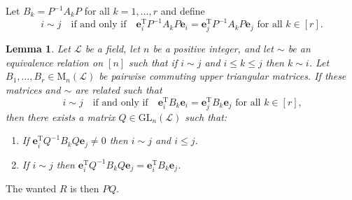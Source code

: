 \documentclass[12pt]{article}
\newtheorem{lemma}[theorem]{Lemma}
\newcommand{\mc}{\mathcal}
\newcommand{\vek}{\mathbf}
\newcommand{\Mat}{\mathrm{M}}
\newcommand{\GL}{\mathrm{GL}}
\newcommand{\Trans}[1]{#1^{\mathrm{T}}\!}
\begin{document}
\noindent
Let \(B_k = P^{-1} A_k P\) for all \(k=1,\dotsc,r\) and define
\begin{equation*}
  i \sim j
  \quad\text{if and only if}\quad
  \Trans{\vek{e}_i} P^{-1} A_k P \vek{e}_i = 
    \Trans{\vek{e}_j} P^{-1} A_k P \vek{e}_j
  \text{ for all }k \in [r]\text{.}
\end{equation*}

\begin{lemma}
  Let $\mc{L}$ be a field, let $n$ be a positive integer, and let $\sim$ 
  be an equivalence relation on $[n]$ such that if \(i \sim j\) and 
  \(i \leqslant k \leqslant j\) then \(k \sim i\). Let \(B_1,\dotsc,B_r 
  \in \Mat_n(\mc{L})\) be pairwise commuting upper triangular matrices. 
  If these matrices and $\sim$ are related such that
  \begin{equation*}
    i \sim j
    \quad\text{if and only if}\quad
    \Trans{\vek{e}_i} B_k \vek{e}_i = \Trans{\vek{e}_j} B_k \vek{e}_j
    \text{ for all }k \in [r]\text{,}
  \end{equation*}
  then there exists a matrix \(Q \in \GL_n(\mc{L})\) such that:
  \begin{enumerate}
    \item
      If \(\Trans{\vek{e}_i} Q^{-1} B_k Q \vek{e}_j \neq 0\) then 
      \(i \sim j\) and \(i \leqslant j\).
    \item
      If \(i \sim j\) then \(\Trans{\vek{e}_i} Q^{-1} B_k Q 
      \vek{e}_j = \Trans{\vek{e}_i} B_k \vek{e}_j\).
  \end{enumerate}
\end{lemma}

\noindent The wanted $R$ is then $PQ$.
\end{document}
